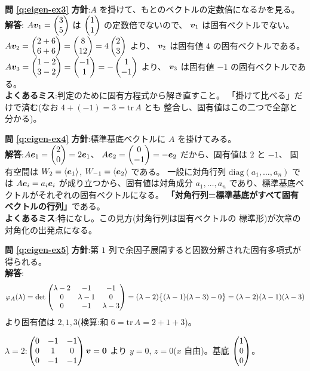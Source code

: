 \bigskip
\noindent\textbf{問 \ref{q:eigen-ex3}}\quad
\textbf{方針}:$A$ を掛けて、もとのベクトルの定数倍になるかを見る。\\
\textbf{解答}:
$A\bm{v}_1 = \begin{pmatrix}3 \\ 5\end{pmatrix}$ は $\begin{pmatrix}1 \\ 1\end{pmatrix}$ の定数倍でないので、
$\bm{v}_1$ は固有ベクトルでない。
$A\bm{v}_2 = \begin{pmatrix}2 + 6 \\ 6 + 6\end{pmatrix} = \begin{pmatrix}8 \\ 12\end{pmatrix} = 4\begin{pmatrix}2 \\ 3\end{pmatrix}$ より、
$\bm{v}_2$ は固有値 $4$ の固有ベクトルである。
$A\bm{v}_3 = \begin{pmatrix}1 - 2 \\ 3 - 2\end{pmatrix} = \begin{pmatrix}-1 \\ 1\end{pmatrix} = -\begin{pmatrix}1 \\ -1\end{pmatrix}$ より、
$\bm{v}_3$ は固有値 $-1$ の固有ベクトルである。\\
\textbf{よくあるミス}:判定のために固有方程式から解き直すこと。
「掛けて比べる」だけで済む(なお $4 + (-1) = 3 = \mathrm{tr}\,A$ とも
整合し、固有値はこの二つで全部と分かる)。

\bigskip
\noindent\textbf{問 \ref{q:eigen-ex4}}\quad
\textbf{方針}:標準基底ベクトルに $A$ を掛けてみる。\\
\textbf{解答}:$A\bm{e}_1 = \begin{pmatrix}2 \\ 0\end{pmatrix} = 2\bm{e}_1$、
$A\bm{e}_2 = \begin{pmatrix}0 \\ -1\end{pmatrix} = -\bm{e}_2$ だから、固有値は $2$ と $-1$、
固有空間は $W_2 = \langle \bm{e}_1 \rangle$,
$W_{-1} = \langle \bm{e}_2 \rangle$ である。
一般に対角行列 $\mathrm{diag}(a_1, \dots, a_n)$ では
$A\bm{e}_i = a_i \bm{e}_i$ が成り立つから、固有値は対角成分
$a_1, \dots, a_n$ であり、標準基底ベクトルがそれぞれの固有ベクトルになる。
\textbf{「対角行列=標準基底がすべて固有ベクトルの行列」}である。\\
\textbf{よくあるミス}:特になし。この見方(対角行列は固有ベクトルの
標準形)が次章の対角化の出発点になる。

\bigskip
\noindent\textbf{問 \ref{q:eigen-ex5}}\quad
\textbf{方針}:第 $1$ 列で余因子展開すると因数分解された固有多項式が
得られる。\\
\textbf{解答}:
\[
\varphi_A(\lambda) = \det\begin{pmatrix}\lambda - 2 & -1 & -1 \\ 0 & \lambda - 1 & 0 \\
0 & -1 & \lambda - 3\end{pmatrix}
= (\lambda - 2)\bigl\{(\lambda - 1)(\lambda - 3) - 0\bigr\}
= (\lambda - 2)(\lambda - 1)(\lambda - 3)
\]
より固有値は $2, 1, 3$(検算:和 $6 = \mathrm{tr}\,A = 2 + 1 + 3$)。

$\lambda = 2$:$\begin{pmatrix}0 & -1 & -1 \\ 0 & 1 & 0 \\ 0 & -1 & -1\end{pmatrix}\bm{v} = \bm{0}$
より $y = 0$, $z = 0$($x$ 自由)。基底 $\begin{pmatrix}1 \\ 0 \\ 0\end{pmatrix}$。

